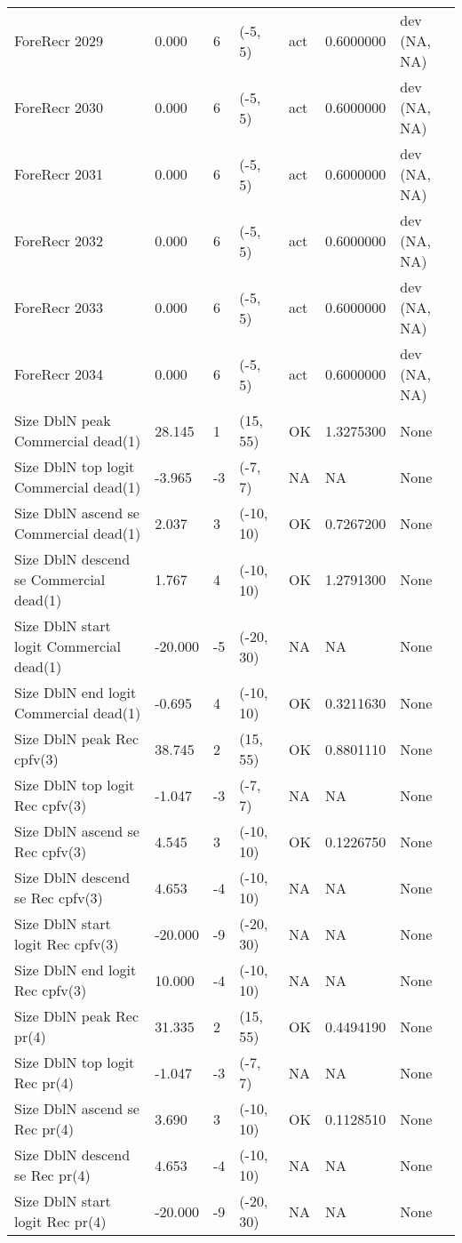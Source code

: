 \documentclass[11pt,
  english,
  letterpaper,
]{article}
\begin{document}
\begin{landscape}
\begin{longtable}[t]{>{\raggedright\arraybackslash}p{7cm}lllll>{\raggedright\arraybackslash}p{4cm}}
ForeRecr 2029 & 0.000 & 6 & (-5, 5) & act & 0.6000000 & dev (NA, NA)\\
ForeRecr 2030 & 0.000 & 6 & (-5, 5) & act & 0.6000000 & dev (NA, NA)\\
ForeRecr 2031 & 0.000 & 6 & (-5, 5) & act & 0.6000000 & dev (NA, NA)\\
ForeRecr 2032 & 0.000 & 6 & (-5, 5) & act & 0.6000000 & dev (NA, NA)\\
ForeRecr 2033 & 0.000 & 6 & (-5, 5) & act & 0.6000000 & dev (NA, NA)\\
ForeRecr 2034 & 0.000 & 6 & (-5, 5) & act & 0.6000000 & dev (NA, NA)\\
Size DblN peak Commercial dead(1) & 28.145 & 1 & (15, 55) & OK & 1.3275300 & None\\
Size DblN top logit Commercial dead(1) & -3.965 & -3 & (-7, 7) & NA & NA & None\\
Size DblN ascend se Commercial dead(1) & 2.037 & 3 & (-10, 10) & OK & 0.7267200 & None\\
Size DblN descend se Commercial dead(1) & 1.767 & 4 & (-10, 10) & OK & 1.2791300 & None\\
Size DblN start logit Commercial dead(1) & -20.000 & -5 & (-20, 30) & NA & NA & None\\
Size DblN end logit Commercial dead(1) & -0.695 & 4 & (-10, 10) & OK & 0.3211630 & None\\
Size DblN peak Rec cpfv(3) & 38.745 & 2 & (15, 55) & OK & 0.8801110 & None\\
Size DblN top logit Rec cpfv(3) & -1.047 & -3 & (-7, 7) & NA & NA & None\\
Size DblN ascend se Rec cpfv(3) & 4.545 & 3 & (-10, 10) & OK & 0.1226750 & None\\
Size DblN descend se Rec cpfv(3) & 4.653 & -4 & (-10, 10) & NA & NA & None\\
Size DblN start logit Rec cpfv(3) & -20.000 & -9 & (-20, 30) & NA & NA & None\\
Size DblN end logit Rec cpfv(3) & 10.000 & -4 & (-10, 10) & NA & NA & None\\
Size DblN peak Rec pr(4) & 31.335 & 2 & (15, 55) & OK & 0.4494190 & None\\
Size DblN top logit Rec pr(4) & -1.047 & -3 & (-7, 7) & NA & NA & None\\
Size DblN ascend se Rec pr(4) & 3.690 & 3 & (-10, 10) & OK & 0.1128510 & None\\
Size DblN descend se Rec pr(4) & 4.653 & -4 & (-10, 10) & NA & NA & None\\
Size DblN start logit Rec pr(4) & -20.000 & -9 & (-20, 30) & NA & NA & None\\

\end{longtable}
\end{landscape}
\end{document}

